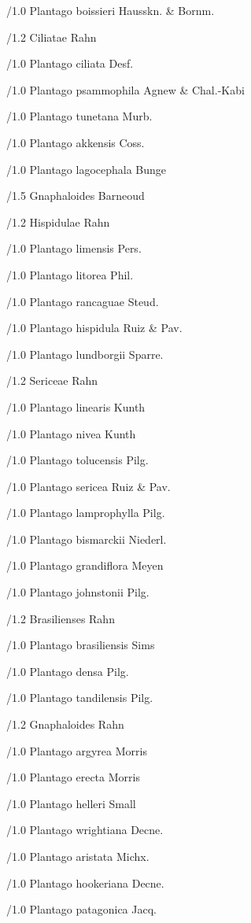 \documentclass[12pt]{article}
\begin{document}
\begin{classif}{1.0}
	/1.0 {Plantago boissieri} Hausskn. \& Bornm.

/1.2 Ciliatae Rahn

	/1.0 {Plantago ciliata} Desf.

	/1.0 {Plantago psammophila} Agnew \& Chal.-Kabi

	/1.0 {Plantago tunetana} Murb.

	/1.0 {Plantago akkensis} Coss.

	/1.0 {Plantago lagocephala} Bunge

/1.5 Gnaphaloides Barneoud

/1.2 Hispidulae Rahn

	/1.0 {Plantago limensis} Pers.

	/1.0 {Plantago litorea} Phil.

	/1.0 {Plantago rancaguae} Steud.

	/1.0 {Plantago hispidula} Ruiz \& Pav.

	/1.0 {Plantago lundborgii} Sparre.

/1.2 Sericeae Rahn

	/1.0 {Plantago linearis} Kunth

	/1.0 {Plantago nivea} Kunth

	/1.0 {Plantago tolucensis} Pilg.

	/1.0 {Plantago sericea} Ruiz \& Pav.

	/1.0 {Plantago lamprophylla} Pilg.

	/1.0 {Plantago bismarckii} Niederl.

	/1.0 {Plantago grandiflora} Meyen

	/1.0 {Plantago johnstonii} Pilg.

/1.2 Brasilienses Rahn

	/1.0 {Plantago brasiliensis} Sims

	/1.0 {Plantago densa} Pilg.

	/1.0 {Plantago tandilensis} Pilg.

/1.2 Gnaphaloides Rahn

	/1.0 {Plantago argyrea} Morris

	/1.0 {Plantago erecta} Morris

	/1.0 {Plantago helleri} Small

	/1.0 {Plantago wrightiana} Decne.

	/1.0 {Plantago aristata} Michx.

	/1.0 {Plantago hookeriana} Decne.

	/1.0 {Plantago patagonica} Jacq.

\end{classif}
\end{document}
